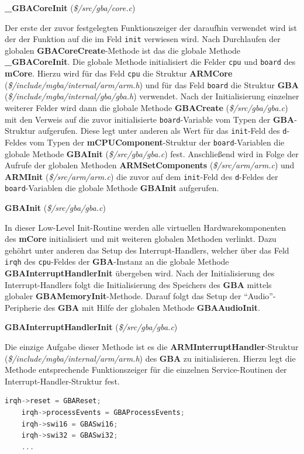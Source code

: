 \documentclass[11pt,a4paper]{scrartcl}
\newcommand{\paratitlecode}[2] {
    \vspace{5mm}
    \large \textbf{#1} \normalsize(\textit{\${#2}})
    \vspace{2mm}\newline
}
\begin{document}
\paratitlecode{{\_}GBACoreInit}{/src/gba/core.c}
Der erste der zuvor festgelegten Funktionszeiger der daraufhin verwendet wird ist der der Funktion auf die im Feld \verb|init| verwiesen wird. Nach Durchlaufen der globalen \textbf{GBACoreCreate}-Methode ist das die globale Methode \textbf{{\_}GBACoreInit}. Die globale Methode initialisiert die Felder \verb|cpu| und \verb|board| des \textbf{mCore}. Hierzu wird f\"ur das Feld \verb|cpu| die Struktur \textbf{ARMCore} (\textit{\$/include/mgba/internal/arm/arm.h}) und f\"ur das Feld \verb|board| die Struktur \textbf{GBA} (\textit{\$/include/mgba/internal/gba/gba.h}) verwendet. Nach der Initialisierung einzelner weiterer Felder wird dann die globale Methode \textbf{GBACreate} (\textit{\$/src/gba/gba.c}) mit den Verweis auf die zuvor initialisierte \verb|board|-Variable vom Typen der \textbf{GBA}-Struktur aufgerufen. Diese legt unter anderen als Wert f\"ur das \verb|init|-Feld des \verb|d|-Feldes vom Typen der \textbf{mCPUComponent}-Struktur der \verb|board|-Variablen die globale Methode \textbf{GBAInit} (\textit{\$/src/gba/gba.c}) fest. Anschlie{\ss}end wird in Folge der Aufrufe der globalen Methoden \textbf{ARMSetComponents} (\textit{\$/src/arm/arm.c}) und \textbf{ARMInit} (\textit{\$/src/arm/arm.c}) die zuvor auf dem \verb|init|-Feld des \verb|d|-Feldes der \verb|board|-Variablen die globale Methode \textbf{GBAInit} aufgerufen.

\newpage
\paratitlecode{GBAInit}{/src/gba/gba.c}
In dieser Low-Level Init-Routine werden alle virtuellen Hardwarekomponenten des \textbf{mCore} initialisiert und mit weiteren globalen Methoden verlinkt. Dazu geh\"ohrt unter anderen das Setup des Interrupt-Handlers, welcher \"uber das Feld \verb|irqh| des \verb|cpu|-Feldes der \textbf{GBA}-Instanz an die globale Methode \textbf{GBAInterruptHandlerInit} \"ubergeben wird. Nach der Initialisierung des Interrupt-Handlers folgt die Initialisierung des Speichers des \textbf{GBA} mittels globaler \textbf{GBAMemoryInit}-Methode. Darauf folgt das Setup der \enquote{Audio}-Peripherie des \textbf{GBA} mit Hilfe der globalen Methode \textbf{GBAAudioInit}.

\paratitlecode{GBAInterruptHandlerInit}{/src/gba/gba.c}
Die einzige Aufgabe dieser Methode ist es die \textbf{ARMInterruptHandler}-Struktur (\textit{\$/include/mgba/internal/arm/arm.h}) des \textbf{GBA} zu initialisieren. Hierzu legt die Methode entsprechende Funktionszeiger f\"ur die einzelnen Service-Routinen der Interrupt-Handler-Struktur fest.

\vspace{5mm}
\begin{lstlisting}[language=C++, caption={Ausschnitt aus der \textbf{GBAInterruptHandlerInit}-Methode}, label={list:GBAInterruptHandlerInit}]
    irqh->reset = GBAReset;
    irqh->processEvents = GBAProcessEvents;
    irqh->swi16 = GBASwi16;
    irqh->swi32 = GBASwi32;
    ...
\end{lstlisting}
\end{document}
